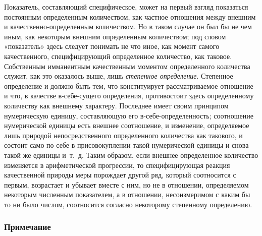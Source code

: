 Показатель, составляющий специфическое, может на первый взгляд показаться
постоянным определенным количеством, как частное отношения между внешним и
качественно-определенным количеством. Но в таком случае он был бы не чем
иным, как некоторым внешним определенным количеством; под словом
«показатель» здесь следует понимать не что иное, как момент самого
качественного, специфицирующий определенное количество, как таковое.
Собственным имманентным качественным моментом определенного количества
служит, как это оказалось выше, лишь {\em степенное
определение}. Степенное определение и должно быть тем, что конституирует
рассматриваемое отношение и что, в качестве в-себе-сущего определения,
противостоит здесь определенному количеству как внешнему характеру.
Последнее имеет своим принципом нумерическую единицу, составляющую его
в-себе-определенность; соотношение нумерической единицы есть внешнее
соотношение, и изменение, определяемое лишь природой непосредственного
определенного количества как такового, и состоит само по себе в
присовокуплении такой нумерической единицы и снова такой же единицы и~т.~д.
Таким образом, если внешнее определенное количество изменяется в
арифметической прогрессии, то специфицирующая реакция качественной природы
меры порождает другой ряд, который соотносится с первым, возрастает и
убывает вместе с ним, но не в отношении, определяемом некоторым численным
показателем, а в отношении, несоизмеримом с каким бы то ни было числом,
соотносится согласно некоторому степенному определению.


\subsubsection[Примечание]{Примечание}

